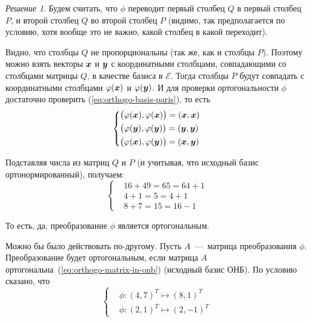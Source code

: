 \documentclass[a4paper,12pt]{article}
\theoremstyle{remark}
\newtheorem*{finalsolution}{Решение}
\begin{document}
  \begin{finalsolution}
    Будем считать, что $\phi$ переводит первый столбец $Q$ в первый столбец $P$, и второй столбец $Q$ во второй столбец $P$ (видимо, так предполагается по условию, хотя вообще это не важно, какой столбец в какой переходит).
    
    Видно, что столбцы $Q$ не пропорциональны (так же, как и столбцы $P$).
    Поэтому можно взять векторы $\boldsymbol x$ и $\boldsymbol y$ с координатными столбцами, совпадающими со столбцами матрицы $Q$, в качестве базиса в $\mathcal E$.
    Тогда столбцы $P$ будут совпадать с координатными столбцами $\varphi(\boldsymbol x)$ и $\varphi(\boldsymbol y)$.
    И для проверки ортогональности $\phi$ достаточно проверить (\ref{eq:orthogo-basis-paris}), то есть
    \[
      \left\{
        \begin{aligned}
          &\bigl(\varphi(\boldsymbol x), \varphi(\boldsymbol x)\bigr) = (\boldsymbol x, \boldsymbol x)\\
          &\bigl(\varphi(\boldsymbol y), \varphi(\boldsymbol y)\bigr) = (\boldsymbol y, \boldsymbol y)\\
          &\bigl(\varphi(\boldsymbol x), \varphi(\boldsymbol y)\bigr) = (\boldsymbol x, \boldsymbol y)
        \end{aligned}
      \right.
    \]
    
    Подставляя числа из матриц $Q$ и $P$ (и учитывая, что исходный базис ортонормированный), получаем:
    \[
      \left\{
        \begin{aligned}
          &16 + 49 = 65 = 64 + 1\\
          &4 + 1 = 5 = 4 + 1\\
          &8 + 7 = 15 = 16 - 1
        \end{aligned}
      \right.
    \]
    
    То есть, да, преобразование $\phi$ является ортогональным.
    
    \medskip
    
    Можно бы было действовать по-другому.
    Пусть $A$~---~матрица преобразования $\phi$.
    Преобразование будет ортогональным, если матрица $A$ ортогональна~(\ref{eq:orthogo-matrix-in-onb}) (исходный базис ОНБ).
    По условию сказано, что
    \[
      \left\{
        \begin{aligned}
          &\phi\colon (4, 7)^T \mapsto (8, 1)^T\\
          &\phi\colon (2, 1)^T \mapsto (2, -1)^T
        \end{aligned}
      \right.
    \]
    

\end{finalsolution}
\end{document}

